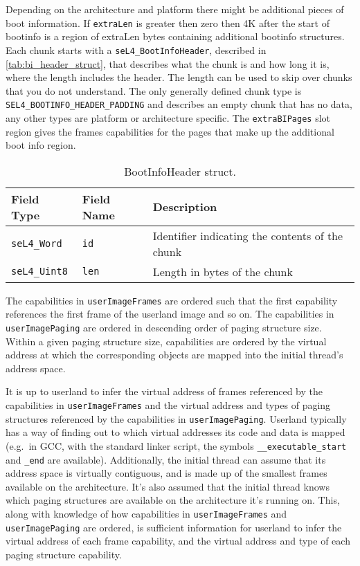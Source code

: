 Depending on the architecture and platform there might be additional pieces of boot
information. If \texttt{extraLen} is greater then zero then 4K after the start of bootinfo
is a region of extraLen bytes containing additional bootinfo structures. Each chunk starts
with a \texttt{seL4\_BootInfoHeader}, described in \autoref{tab:bi_header_struct}, that
describes what the chunk is and how long it is, where the length includes the header. The
length can be used to skip over chunks that you do not understand. The only generally
defined chunk type is \texttt{SEL4\_BOOTINFO\_HEADER\_PADDING} and describes an empty
chunk that has no data, any other types are platform or architecture specific. The
\texttt{extraBIPages} slot region gives the frames capabilities for the pages that make up
the additional boot info region.

\begin{table}[htb]
  \begin{center}
    \caption{BootInfoHeader struct.}
    \label{tab:bi_header_struct}
    \begin{tabular}{lll}
      \toprule
      Field Type & Field Name & Description \\
      \midrule
      \texttt{seL4\_Word}  & \texttt{id}  & Identifier indicating the contents of the chunk \\
      \texttt{seL4\_Uint8} & \texttt{len} & Length in bytes of the chunk \\
      \bottomrule
    \end{tabular}
  \end{center}
\end{table}

The capabilities in \texttt{userImageFrames} are
ordered such that the first capability references the first frame of the
userland image and so on.
The capabilities in \texttt{userImagePaging} are ordered in descending order
of paging structure size. Within a given paging structure size, capabilities are
ordered by the virtual address at which the corresponding objects are mapped
into the initial thread's address space.

It is up to userland to infer the virtual address of frames referenced by
the capabilities in \texttt{userImageFrames} and the virtual address and
types of paging structures
referenced by the capabilities in \texttt{userImagePaging}.
Userland typically has a way of finding out to which virtual addresses its
code and data is mapped (e.g.\ in GCC, with the standard linker script, the
symbols \texttt{\_\_executable\_start} and \texttt{\_end} are available).
Additionally, the initial thread can assume that its address space is virtually
contiguous, and is made up of the smallest frames available on the architecture.
It's also assumed that the initial thread knows which paging structures are
available on the architecture it's running on.
This, along with knowledge of how capabilities in \texttt{userImageFrames} and
\texttt{userImagePaging} are ordered, is sufficient information for userland to infer
the virtual address of each
frame capability, and the virtual address and type of each paging structure capability.

